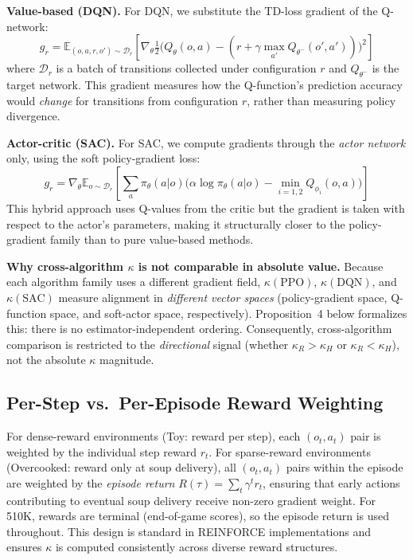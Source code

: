 \documentclass[letterpaper]{article}
\begin{document}
\medskip
\noindent\textbf{Value-based (DQN).}
For DQN, we substitute the TD-loss gradient of the Q-network:
\begin{equation}
g_r = \mathbb{E}_{(o,a,r,o')\sim \mathcal{D}_r}\!\left[ \nabla_\theta \tfrac{1}{2}\bigl(Q_\theta(o,a) - (r + \gamma \max_{a'} Q_{\theta^-}(o',a'))\bigr)^2 \right]
\end{equation}
where $\mathcal{D}_r$ is a batch of transitions collected under configuration $r$ and $Q_{\theta^-}$ is the target network.
This gradient measures how the Q-function's prediction accuracy would \textit{change} for transitions from configuration $r$, rather than measuring policy divergence.

\medskip
\noindent\textbf{Actor-critic (SAC).}
For SAC, we compute gradients through the \textit{actor network} only, using the soft policy-gradient loss:
\begin{equation}
g_r = \nabla_\theta \mathbb{E}_{o\sim\mathcal{D}_r}\!\left[ \sum_a \pi_\theta(a|o)\bigl(\alpha \log \pi_\theta(a|o) - \min_{i=1,2} Q_{\phi_i}(o,a)\bigr) \right]
\end{equation}
This hybrid approach uses Q-values from the critic but the gradient is taken with respect to the actor's parameters, making it structurally closer to the policy-gradient family than to pure value-based methods.

\medskip
\noindent\textbf{Why cross-algorithm $\kappa$ is not comparable in absolute value.}
Because each algorithm family uses a different gradient field, $\kappa(\text{PPO})$, $\kappa(\text{DQN})$, and $\kappa(\text{SAC})$ measure alignment in \textit{different vector spaces} (policy-gradient space, Q-function space, and soft-actor space, respectively).
Proposition~4 below formalizes this: there is no estimator-independent ordering.
Consequently, cross-algorithm comparison is restricted to the \textit{directional} signal (whether $\kappa_R > \kappa_H$ or $\kappa_R < \kappa_H$), not the absolute $\kappa$ magnitude.

\subsection{Per-Step vs.\ Per-Episode Reward Weighting}

For dense-reward environments (Toy: reward per step), each $(o_t, a_t)$ pair is weighted by the individual step reward $r_t$.
For sparse-reward environments (Overcooked: reward only at soup delivery), all $(o_t, a_t)$ pairs within the episode are weighted by the \textit{episode return} $R(\tau) = \sum_t \gamma^t r_t$, ensuring that early actions contributing to eventual soup delivery receive non-zero gradient weight.
For 510K, rewards are terminal (end-of-game scores), so the episode return is used throughout.
This design is standard in REINFORCE implementations and ensures $\kappa$ is computed consistently across diverse reward structures.
\end{document}
